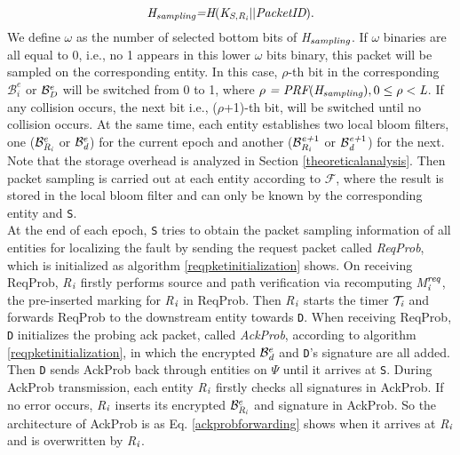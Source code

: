 \begin{equation}\label{hashsampling}
\emph{H}_{\emph{sampling}}\emph{=} \emph{H}(\emph{K}_{\emph{S},\emph{R}_{\emph{i}}} \vert \vert \emph{PacketID}). 
\end{equation}
We define $\omega$ as the number of selected bottom bits of \emph{H}$_{\emph{sampling}}$. If $\omega$ binaries are all equal to 0, i.e., no 1 appears in this lower $\omega$ bits binary, this packet will be sampled on the corresponding entity. In this case, $\rho$-th bit in the corresponding $\mathcal{B}_i^e$ or $\mathcal{B}_\emph{D}^e$ will be switched from 0 to 1, where $\rho ~\emph{=}~ \emph{PRF}(\emph{H}_{\emph{sampling}}),0\leq \rho < \emph{L}$. If any collision occurs, the next bit i.e., ($\rho$+1)-th bit, will be switched until no collision occurs. At the same time, each entity establishes two local bloom filters, one ($\mathcal{B}_{\emph{R}_\emph{i}}^e$ or $\mathcal{B}_\emph{d}^e$) for the current epoch and another ($\mathcal{B}_{\emph{R}_\emph{i}}^{\emph{e+}1}$ or $\mathcal{B}_\emph{d}^{\emph{e+}1}$) for the next. Note that the storage overhead is analyzed in Section \ref{theoreticalanalysis}. Then packet sampling is carried out at each entity according to $\mathcal{F}$, where the result is stored in the local bloom filter and can only be known by the corresponding entity and {\tt S}.\\
\indent
At the end of each epoch, {\tt S} tries to obtain the packet sampling information of all entities for localizing the fault by sending the request packet called \emph{ReqProb}, %
which is initialized as algorithm \ref{reqpketinitialization} shows. On receiving ReqProb, \emph{R}$_\emph{i}$ firstly performs source and path verification via recomputing \emph{M}$_\emph{i}^{\emph{req}}$, the pre-inserted marking for \emph{R}$_\emph{i}$ in ReqProb. Then \emph{R}$_\emph{i}$ starts the timer $\mathcal{T}_\emph{i}$ and forwards ReqProb to the downstream entity towards {\tt D}. When receiving ReqProb, {\tt D} initializes the probing ack packet, called \emph{AckProb}, according to algorithm \ref{reqpketinitialization}, in which the encrypted $\mathcal{B}_\emph{d}^e$ and {\tt D}'s signature are all added. Then {\tt D} sends AckProb back through entities on $\Psi$ until it arrives at {\tt S}. During AckProb transmission, each entity \emph{R}$_\emph{i}$ firstly checks all signatures in AckProb. If no error occurs, \emph{R}$_\emph{i}$ inserts its encrypted $\mathcal{B}_{\emph{R}_\emph{i}}^e$ and signature in AckProb. So the architecture of AckProb is as Eq. \ref{ackprobforwarding} shows when it arrives at \emph{R}$_\emph{i}$ and is overwritten by \emph{R}$_\emph{i}$.
